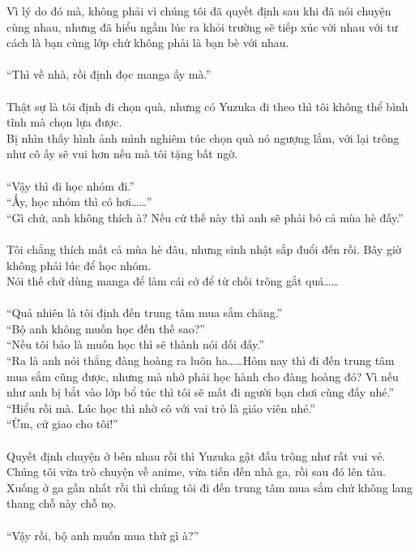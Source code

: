 \documentclass[12pt,a4paper, twosides]{book}
\begin{document}
Vì lý do đó mà, không phải vì chúng tôi đã quyết định sau khi đã nói chuyện cùng nhau, nhưng đã hiểu ngầm lúc ra khỏi trường sẽ tiếp xúc với nhau với tư cách là bạn cùng lớp chứ không phải là bạn bè với nhau.\\
\\
“Thì về nhà, rồi định đọc manga ấy mà.”\\
\\
Thật sự là tôi định đi chọn quà, nhưng có Yuzuka đi theo thì tôi không thể bình tĩnh mà chọn lựa được.\\
Bị nhìn thấy hình ảnh mình nghiêm túc chọn quà nó ngượng lắm, với lại trông như cô ấy sẽ vui hơn nếu mà tôi tặng bất ngờ.\\
\\
“Vậy thì đi học nhóm đi.”\\
“Ấy, học nhóm thì có hơi……”\\
“Gì chứ, anh không thích à? Nếu cứ thế này thì anh sẽ phải bỏ cả mùa hè đấy.”\\
\\
Tôi chẳng thích mất cả mùa hè đâu, nhưng sinh nhật sắp đuổi đến rồi. Bây giờ không phải lúc để học nhóm.\\
Nói thế chứ dùng manga để làm cái cớ để từ chối trông gắt quá……\\
\\
“Quả nhiên là tôi định đến trung tâm mua sắm chăng.”\\
“Bộ anh không muốn học đến thế sao?”\\
“Nếu tôi bảo là muốn học thì sẽ thành nói dối đấy.”\\
“Ra là anh nói thẳng đàng hoàng ra luôn ha……Hôm nay thì đi đến trung tâm mua sắm cũng được, nhưng mà nhớ phải học hành cho đàng hoàng đó? Vì nếu như anh bị bắt vào lớp bổ túc thì tôi sẽ mất đi người bạn chơi cùng đấy nhé.”\\
“Hiểu rồi mà. Lúc học thì nhờ cô với vai trò là giáo viên nhé.”\\
“Ừm, cứ giao cho tôi!”\\
\\
Quyết định chuyện ở bên nhau rồi thì Yuzuka gật đầu trông như rất vui vẻ.\\
Chúng tôi vừa trò chuyện về anime, vừa tiến đến nhà ga, rồi sau đó lên tàu.\\
Xuống ở ga gần nhất rồi thì chúng tôi đi đến trung tâm mua sắm chứ không lang thang chỗ này chỗ nọ.\\
\\
“Vậy rồi, bộ anh muốn mua thứ gì à?”\\
\end{document}
